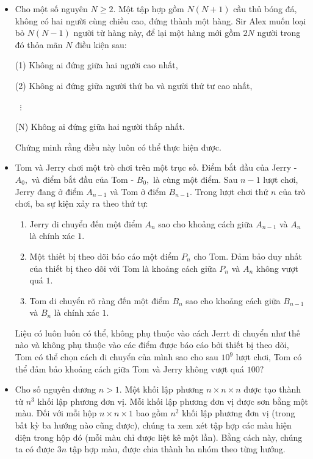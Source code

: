 \documentclass[11pt]{scrartcl}
\begin{document}
\begin{itemize}[label=, leftmargin=0em, itemsep=0.5em]
    \item \begin{btvn}
        Cho một số nguyên $N \ge 2$. Một tập hợp gồm $N(N + 1)$ cầu thủ bóng đá, không có hai người cùng chiều cao, đứng thành một hàng. Sir Alex muốn loại bỏ $N(N - 1)$ người từ hàng này, để lại một hàng mới gồm $2N$ người trong đó thỏa mãn $N$ điều kiện sau:

        (1) Không ai đứng giữa hai người cao nhất,

        (2) Không ai đứng giữa người thứ ba và người thứ tư cao nhất,

        $\;\;\vdots$

        (N) Không ai đứng giữa hai người thấp nhất.

        Chứng minh rằng điều này luôn có thể thực hiện được.
    \end{btvn}


    \item \begin{btvn}
        Tom và Jerry chơi một trò chơi trên một trục số. Điểm bắt đầu của Jerry - $A_0,$ và điểm bắt đầu của Tom - $B_0,$ là cùng một điểm. Sau $n-1$ lượt chơi, Jerry đang ở điểm $A_{n-1}$ và Tom ở điểm $B_{n-1}.$ Trong lượt chơi thứ $n$ của trò chơi, ba sự kiện xảy ra theo thứ tự:
        \begin{enumerate}
            \item Jerry di chuyển đến một điểm $A_n$ sao cho khoảng cách giữa $A_{n-1}$ và $A_n$ là chính xác $1$.
            \item Một thiết bị theo dõi báo cáo một điểm $P_n$ cho Tom. Đảm bảo duy nhất của thiết bị theo dõi với Tom là khoảng cách giữa $P_n$ và $A_n$ không vượt quá $1$.
            \item Tom di chuyển rõ ràng đến một điểm $B_n$ sao cho khoảng cách giữa $B_{n-1}$ và $B_n$ là chính xác $1$.
        \end{enumerate}
        Liệu có luôn luôn có thể, không phụ thuộc vào cách Jerrt di chuyển như thế nào và không phụ thuộc vào các điểm được báo cáo bởi thiết bị theo dõi, Tom có thể chọn cách di chuyển của mình sao cho sau $10^9$ lượt chơi, Tom có thể đảm bảo khoảng cách giữa Tom và Jerry không vượt quá $100?$
    \end{btvn}

    \item \begin{btvn}
        Cho số nguyên dương $n > 1$. Một khối lập phương $n \times n \times n$ được tạo thành từ $n^3$ khối lập phương đơn vị. Mỗi khối lập phương đơn vị được sơn bằng một màu. Đối với mỗi hộp $n \times n \times 1$ bao gồm $n^2$ khối lập phương đơn vị (trong bất kỳ ba hướng nào cũng được), chúng ta xem xét tập hợp các màu hiện diện trong hộp đó (mỗi màu chỉ được liệt kê một lần). Bằng cách này, chúng ta có được $3n$ tập hợp màu, được chia thành ba nhóm theo từng hướng.


\end{btvn}
\end{itemize}
\end{document}
